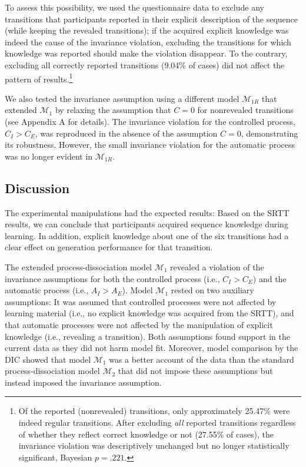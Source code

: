\documentclass[english,,man]{apa6}
\begin{document}
To assess this possibility, we used the questionnaire data to exclude any transitions that participants reported in their explicit description of the sequence
(while keeping the revealed transitions);
if the acquired explicit knowledge was indeed the cause of the invariance violation,
excluding the transitions for which knowledge was reported should make the violation disappear.
To the contrary, excluding all correctly reported transitions (9.04\% of cases) did not affect the pattern of results.\footnote{Of the reported (nonrevealed) transitions, only approximately 25.47\% were indeed regular transitions.
  After excluding \emph{all} reported transitions regardless of whether they reflect correct knowledge or not (27.55\% of cases),
  the invariance violation was descriptively unchanged but no longer statistically significant, Bayesian \(p = .221\).}

We also tested the invariance assumption using a different model \(\mathcal{M}_{1R}\) that extended \(\mathcal{M}_1\) by relaxing the assumption that \(C = 0\) for nonrevealed transitions (see Appendix A for details).
The invariance violation for the controlled process, \(C_I > C_E\), was reproduced in the absence of the assumption \(C=0\), demonstrating its robustness.
However, the small invariance violation for the automatic process was no longer evident in \(\mathcal{M}_{1R}\).

\hypertarget{discussion-1}{%
\subsection{Discussion}\label{discussion-1}}

The experimental manipulations had the expected results:
Based on the SRTT results, we can conclude that participants acquired sequence knowledge during learning.
In addition, explicit knowledge about one of the six transitions had a clear effect on generation performance for that transition.

The extended process-dissociation model \(\mathcal{M}_1\) revealed a violation of the invariance assumptions for both the controlled process (i.e., \(C_I > C_E\)) and the automatic process (i.e., \(A_I > A_E\)).
Model \(\mathcal{M}_1\) rested on two auxiliary assumptions:
It was assumed that controlled processes were not affected by learning material (i.e., no explicit knowledge was acquired from the SRTT),
and that automatic processes were not affected by the manipulation of explicit knowledge (i.e., revealing a transition).
Both assumptions found support in the current data as they did not harm model fit.
Moreover, model comparison by the DIC showed that model \(\mathcal{M}_1\) was a better account of the data than the standard process-dissociation model \(\mathcal{M}_2\) that did not impose these assumptions but instead imposed the invariance assumption.
\end{document}
